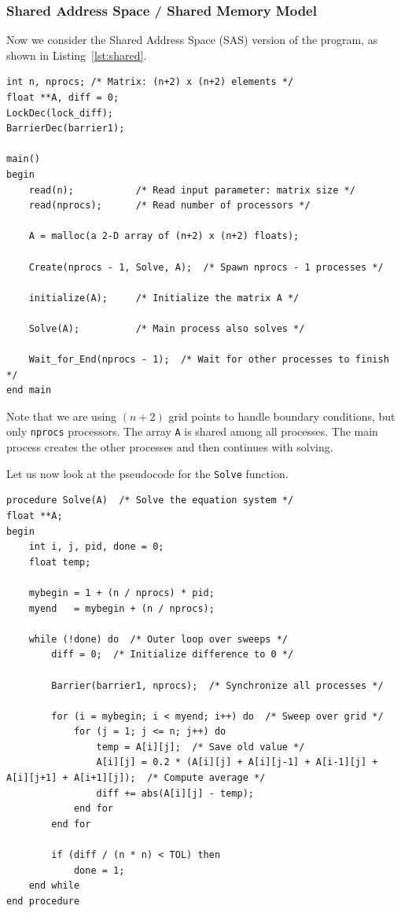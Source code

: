 \documentclass[12pt]{book}
\begin{document}
\subsubsection{Shared Address Space / Shared Memory Model}

Now we consider the Shared Address Space (SAS) version of the program, as shown in Listing~\ref{lst:shared}.

\begin{lstlisting}[style=cppstyle, caption={Shared Address Space Version}, captionpos=b, label={lst:shared}]
int n, nprocs; /* Matrix: (n+2) x (n+2) elements */
float **A, diff = 0;
LockDec(lock_diff);
BarrierDec(barrier1);

main()
begin
    read(n);           /* Read input parameter: matrix size */
    read(nprocs);      /* Read number of processors */
    
    A = malloc(a 2-D array of (n+2) x (n+2) floats);
    
    Create(nprocs - 1, Solve, A);  /* Spawn nprocs - 1 processes */
    
    initialize(A);     /* Initialize the matrix A */
    
    Solve(A);          /* Main process also solves */
    
    Wait_for_End(nprocs - 1);  /* Wait for other processes to finish */
end main
\end{lstlisting}

Note that we are using $(n+2)$ grid points to handle boundary conditions, but only \texttt{nprocs} processors. The array \texttt{A} is shared among all processes. The main process creates the other processes and then continues with solving. 

Let us now look at the pseudocode for the \texttt{Solve} function.

\begin{lstlisting}[style=cppstyle, caption={Solve Function}, captionpos=b, label={lst:solve}]
procedure Solve(A)  /* Solve the equation system */
float **A;
begin
    int i, j, pid, done = 0;
    float temp;

    mybegin = 1 + (n / nprocs) * pid;
    myend   = mybegin + (n / nprocs);

    while (!done) do  /* Outer loop over sweeps */
        diff = 0;  /* Initialize difference to 0 */

        Barrier(barrier1, nprocs);  /* Synchronize all processes */

        for (i = mybegin; i < myend; i++) do  /* Sweep over grid */
            for (j = 1; j <= n; j++) do
                temp = A[i][j];  /* Save old value */
                A[i][j] = 0.2 * (A[i][j] + A[i][j-1] + A[i-1][j] + A[i][j+1] + A[i+1][j]);  /* Compute average */
                diff += abs(A[i][j] - temp);
            end for
        end for

        if (diff / (n * n) < TOL) then
            done = 1;
    end while
end procedure
\end{lstlisting}
\end{document}
